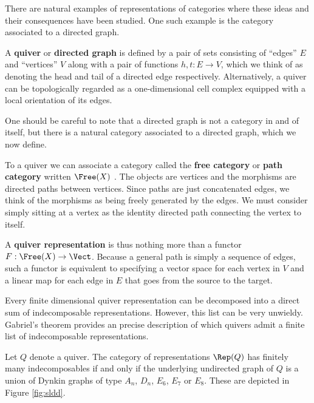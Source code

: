 There are natural examples of representations of categories where these ideas and their consequences have been studied. One such example is the category associated to a directed graph. 

\begin{defn}
A \textbf{quiver} or \textbf{directed graph} is defined by a pair of sets consisting of ``edges'' $E$ and ``vertices'' $V$ along with a pair of functions $h,t:E\to V$, which we think of as denoting the head and tail of a directed edge respectively. Alternatively, a quiver can be topologically regarded as a one-dimensional cell complex equipped with a local orientation of its edges.
\end{defn}

One should be careful to note that a directed graph is not a category in and of itself, but there is a natural category associated to a directed graph, which we now define.

\begin{defn}
To a quiver we can associate a category called the \textbf{free category} or \textbf{path category} written $\Free(X)$ . The objects are vertices and the morphisms are directed paths between vertices. Since paths are just concatenated edges, we think of the morphisms as being freely generated by the edges. We must consider simply sitting at a vertex as the identity directed path connecting the vertex to itself. 
\end{defn}

\begin{defn}
A \textbf{quiver representation} is thus nothing more than a functor $F:\Free(X)\to \Vect$. Because a general path is simply a sequence of edges, such a functor is equivalent to specifying a vector space for each vertex in $V$ and a linear map for each edge in $E$ that goes from the source to the target.
\end{defn}

Every finite dimensional quiver representation can be decomposed into a direct sum of indecomposable representations. However, this list can be very unwieldy. Gabriel's theorem provides an precise description of which quivers admit a finite list of indecomposable representations.

\begin{thm}\label{thm:gabriel}
Let $Q$ denote a quiver. The category of representations $\Rep(Q)$ has finitely many indecomposables if and only if the underlying undirected graph of $Q$ is a union of Dynkin graphs of type $A_n$, $D_n$, $E_6$, $E_7$ or $E_8$. These are depicted in Figure \ref{fig:sldd}.
\end{thm}

